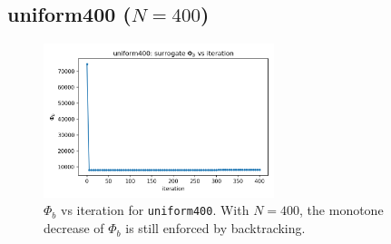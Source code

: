 \documentclass[11pt,a4paper]{article}
\numberwithin{equation}{section}
\newcommand{\phib}{\Phi_b}
\begin{document}
\subsection{uniform400 ($N{=}400$)}
\begin{figure}[h!]
\centering
\includegraphics[width=0.6\textwidth]{figures/uniform400_phib_vs_iter.png}
\caption{$\phib$ vs iteration for \texttt{uniform400}. With $N{=}400$, the monotone decrease of $\phib$ is still enforced by backtracking.}
\label{fig:uniform400_iter}
\end{figure}
\end{document}

